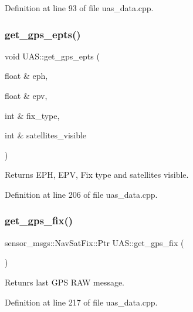 Definition at line 93 of file uas\+\_\+data.\+cpp.

\mbox{\label{group__nodelib_ga17cd0e13d3dce3ec697646bb543ba6e7}} 
\subsubsection{\texorpdfstring{get\_gps\_epts()}{get\_gps\_epts()}}
{\footnotesize\ttfamily void U\+A\+S\+::get\+\_\+gps\+\_\+epts (\begin{DoxyParamCaption}\item[{float \&}]{eph,  }\item[{float \&}]{epv,  }\item[{int \&}]{fix\+\_\+type,  }\item[{int \&}]{satellites\+\_\+visible }\end{DoxyParamCaption})}



Returns E\+PH, E\+PV, Fix type and satellites visible. 



Definition at line 206 of file uas\+\_\+data.\+cpp.

\mbox{\label{group__nodelib_gac4ba509d29c876694293856f39308625}} 
\subsubsection{\texorpdfstring{get\_gps\_fix()}{get\_gps\_fix()}}
{\footnotesize\ttfamily sensor\+\_\+msgs\+::\+Nav\+Sat\+Fix\+::\+Ptr U\+A\+S\+::get\+\_\+gps\+\_\+fix (\begin{DoxyParamCaption}{ }\end{DoxyParamCaption})}



Retunrs last G\+PS R\+AW message. 



Definition at line 217 of file uas\+\_\+data.\+cpp.

\mbox{\label{group__nodelib_gae6fe5bb4dc5d02536c8b7970577b22d7}} 
